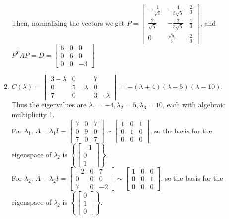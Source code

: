 \documentclass[10pt,english]{article}
\begin{document}
\begin{enumerate}
\begin{enumerate}
    Then, normalizing the vectors we get $P=\begin{bmatrix}-\frac{1}{\sqrt{5}}&-\frac{4}{3\sqrt{5}}&\frac{2}{3}\\\frac{2}{\sqrt{5}}&-\frac{2}{3\sqrt{5}}&\frac{1}{3}\\0&\frac{\sqrt{5}}{3}&\frac{2}{3}\end{bmatrix}$, and $P^TAP=D=\begin{bmatrix}6&0&0\\0&6&0\\0&0&-3\end{bmatrix}$
    
    \pagebreak
    \item $C(\lambda)=\begin{vmatrix}3-\lambda&0&7\\0&5-\lambda&0\\7&0&3-\lambda\end{vmatrix}=-(\lambda+4)(\lambda-5)(\lambda-10)$. Thus the eigenvalues are $\lambda_1=-4,\lambda_2=5,\lambda_3=10$, each with algebraic multiplicity 1. \\ 
    For $\lambda_1$, $A-\lambda_1I=\begin{bmatrix}7&0&7\\0&9&0\\7&0&7\end{bmatrix}\sim\begin{bmatrix}1&0&1\\0&1&0\\0&0&0\end{bmatrix}$, so the basis for the eigenspace of $\lambda_2$ is $\left\{\begin{bmatrix}-1\\0\\1\end{bmatrix}\right\}$. \\ 
    For $\lambda_2$, $A-\lambda_2I=\begin{bmatrix}-2&0&7\\0&0&0\\7&0&-2\end{bmatrix}\sim\begin{bmatrix}1&0&0\\0&0&1\\0&0&0\end{bmatrix}$, so the basis for the eigenspace of $\lambda_2$ is $\left\{\begin{bmatrix}0\\1\\0\end{bmatrix}\right\}$. \\ 

\end{enumerate}
\end{enumerate}
\end{document}
